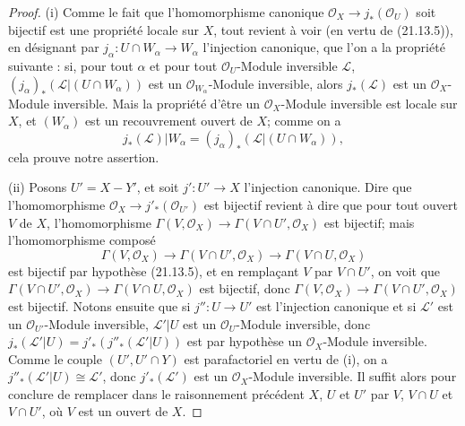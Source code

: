 \begin{proof}
(i) Comme le fait que l'homomorphisme canonique
$\mathcal O_X\to j_*(\mathcal O_U)$ soit bijectif est une propriété locale sur $X$,
tout revient à voir (en vertu de (21.13.5)), en désignant par
$j_\alpha:U\cap W_\alpha\to W_\alpha$ l'injection canonique, que l'on a la propriété
suivante : si, pour tout $\alpha$ et pour tout $\mathcal O_U$-Module inversible
$\mathscr L$, $(j_\alpha)_*(\mathscr L|(U\cap W_\alpha))$ est un
$\mathcal O_{W_\alpha}$-Module inversible, alors $j_*(\mathscr L)$ est un
$\mathcal O_X$-Module inversible. Mais la propriété d'être un $\mathcal O_X$-Module
inversible est locale sur $X$, et $(W_\alpha)$ est un recouvrement ouvert de $X$;
comme on a
\[
  j_*(\mathscr L)|W_\alpha
  =(j_\alpha)_*(\mathscr L|(U\cap W_\alpha)),
\]
cela prouve notre assertion.

(ii) Posons $U'=X-Y'$, et soit $j':U'\to X$ l'injection canonique. Dire que
l'homomorphisme $\mathcal O_X\to j'_*(\mathcal O_{U'})$ est bijectif revient à dire
que pour tout ouvert $V$ de $X$, l'homomorphisme
$\Gamma(V,\mathcal O_X)\to\Gamma(V\cap U',\mathcal O_X)$ est bijectif; mais
l'homomorphisme composé
\[
  \Gamma(V,\mathcal O_X)\longrightarrow\Gamma(V\cap U',\mathcal O_X)
  \longrightarrow\Gamma(V\cap U,\mathcal O_X)
\]
est bijectif par hypothèse (21.13.5), et en remplaçant $V$ par $V\cap U'$, on voit que
$\Gamma(V\cap U',\mathcal O_X)\to\Gamma(V\cap U,\mathcal O_X)$ est bijectif, donc
$\Gamma(V,\mathcal O_X)\to\Gamma(V\cap U',\mathcal O_X)$ est bijectif. Notons ensuite
que si $j'':U\to U'$ est l'injection canonique et si $\mathscr L'$ est un
$\mathcal O_{U'}$-Module inversible, $\mathscr L'|U$ est un $\mathcal O_U$-Module
inversible, donc
$j_*(\mathscr L'|U)=j'_*(j''_*(\mathscr L'|U))$ est par hypothèse un
$\mathcal O_X$-Module inversible. Comme le couple $(U',U'\cap Y)$ est parafactoriel
en vertu de (i), on a $j''_*(\mathscr L'|U)\cong\mathscr L'$, donc
$j'_*(\mathscr L')$ est un $\mathcal O_X$-Module inversible. Il suffit alors pour
conclure de remplacer dans le raisonnement précédent $X$, $U$ et $U'$ par $V$,
$V\cap U$ et $V\cap U'$, où $V$ est un ouvert de $X$.


\end{proof}
